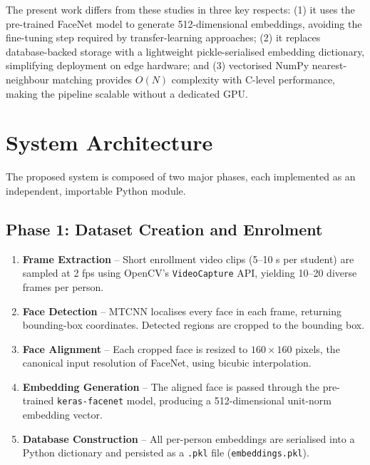 \documentclass[conference]{IEEEtran}
\begin{document}
The present work differs from these studies in three key respects: (1) it uses
the pre-trained FaceNet model to generate 512-dimensional embeddings, avoiding
the fine-tuning step required by transfer-learning approaches; (2) it replaces
database-backed storage with a lightweight pickle-serialised embedding dictionary,
simplifying deployment on edge hardware; and (3) vectorised NumPy nearest-neighbour
matching provides $O(N)$ complexity with C-level performance, making the pipeline
scalable without a dedicated GPU.

\section{System Architecture}

The proposed system is composed of two major phases, each implemented
as an independent, importable Python module.

\subsection{Phase 1: Dataset Creation and Enrolment}

\begin{enumerate}
    \item \textbf{Frame Extraction} -- Short enrollment video clips
          (5--10 s per student) are sampled at 2 fps using OpenCV's
          \texttt{VideoCapture} API, yielding 10--20 diverse frames
          per person.
    \item \textbf{Face Detection} -- MTCNN \cite{b4} localises every
          face in each frame, returning bounding-box coordinates.
          Detected regions are cropped to the bounding box.
    \item \textbf{Face Alignment} -- Each cropped face is resized to
          $160\times160$ pixels, the canonical input resolution of
          FaceNet, using bicubic interpolation.
    \item \textbf{Embedding Generation} -- The aligned face is passed
          through the pre-trained \texttt{keras-facenet} model,
          producing a 512-dimensional unit-norm embedding vector.
    \item \textbf{Database Construction} -- All per-person embeddings
          are serialised into a Python dictionary and persisted as a
          \texttt{.pkl} file (\texttt{embeddings.pkl}).
\end{enumerate}
\end{document}
